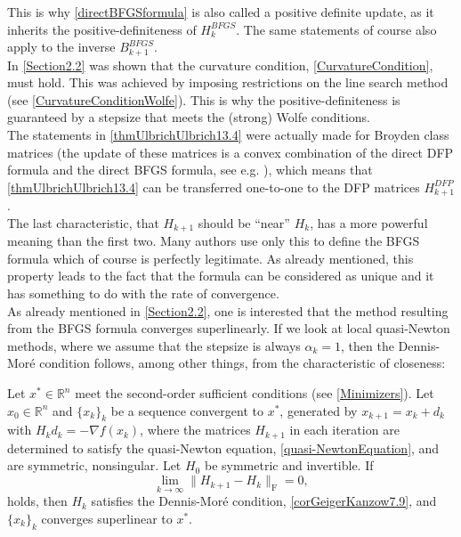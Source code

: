 This is why \cref{directBFGSformula} is also called a positive definite update, as it inherits the positive-definiteness of $H^{BFGS}_k$. The same statements of course also apply to the inverse $B^{BFGS}_{k+1}$. \\
In \cref{Section2.2} was shown that the curvature condition, \cref{CurvatureCondition}, must hold. This was achieved by imposing restrictions on the line search method (see \cref{CurvatureConditionWolfe}). This is why the positive-definiteness is guaranteed by a stepsize that meets the (strong) Wolfe conditions. \\
The statements in \cref{thmUlbrichUlbrich13.4} were actually made for Broyden class matrices (the update of these matrices is a convex combination of the direct DFP formula and the direct BFGS formula, see e.g. \cite[p.~68]{UlbrichUlbrich:2012}), which means that \cref{thmUlbrichUlbrich13.4} can be transferred one-to-one to the DFP matrices $H^{DFP}_{k+1}$. \\
The last characteristic, that $H_{k+1}$ should be “near” $H_k$, has a more powerful meaning than the first two. Many authors use only this to define the BFGS formula which of course is perfectly legitimate. As already mentioned, this property leads to the fact that the formula can be considered as unique and it has something to do with the rate of convergence. \\
As already mentioned in \cref{Section2.2}, one is interested that the method resulting from the BFGS formula converges superlinearly. If we look at local quasi-Newton methods, where we assume that the stepsize is always $\alpha_k = 1$, then the Dennis-Mor\'{e} condition follows, among other things, from the characteristic of closeness:

\begin{lemma}
    Let $x^* \in \mathbb{R}^n$ meet the second-order sufficient conditions (see \cref{Minimizers}). Let $x_0 \in \mathbb{R}^n$ and $\{x_k\}_k$ be a sequence convergent to $x^*$, generated by $x_{k+1} = x_k + d_k$ with $H_k d_k = -\nabla f(x_k)$, where the matrices $H_{k+1}$ in each iteration are determined to satisfy the quasi-Newton equation, \cref{quasi-NewtonEquation}, and are symmetric, nonsingular. Let $H_0$ be symmetric and invertible. If
    \begin{equation*}
        \lim\limits_{k \rightarrow \infty} \lVert H_{k+1} - H_k \rVert_{\mathrm{F}} = 0,
    \end{equation*}
    holds, then $H_k$ satisfies the Dennis-Mor\'{e} condition, \cref{corGeigerKanzow7.9}, and $\{x_k\}_k$ converges superlinear to $x^*$.
\end{lemma}

